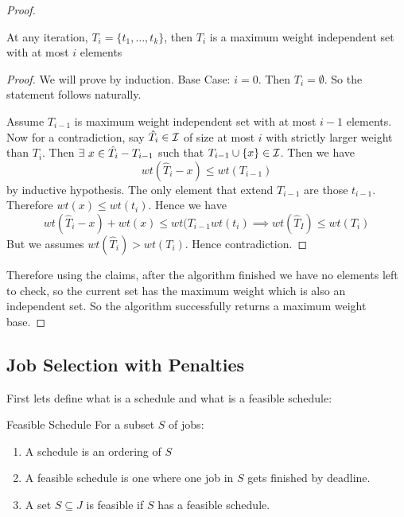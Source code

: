 \begin{proof}
\begin{claimwidth}
	\begin{claim}{}{}
	At any iteration, $T_i=\{t_1,\dots, t_k\}$, then $T_i$ is a maximum weight independent set with at most $i$ elements
\end{claim}
\begin{proof}
	We will prove by induction. Base Case: $i=0$. Then $T_i=\emptyset$. So the statement follows naturally.
	
	Assume $T_{i-1}$ is maximum weight independent set with at most $i-1$ elements. Now for a contradiction, say $\hat{T}_i\in\mathcal{I}$ of size at most $i$ with strictly larger weight than $T_i$. Then $\exists\ x\in \hat{T_i}-T_{i-1}$ such that $T_{i-1}\cup \{x\}\in \mathcal{I}$. Then we have $$wt(\hat{T}_i-x)\leq wt(T_{i-1})$$by inductive hypothesis. The only element that extend $T_{i-1}$ are those $t_{i-1}$. Therefore $wt(x)\leq wt(t_i)$. Hence we have $$wt(\hat{T}_i-x)+wt(x)\leq wt(T_{i-1}wt(t_i)\implies wt(\hat{T}_I)\leq wt(T_i)$$But we assumes $wt(\hat{T}_i)>wt(T_i)$. Hence contradiction. 
\end{proof}
\end{claimwidth}

	\parinn 
	
	Therefore using the claims, after the algorithm finished we have no elements left to check, so the current set has the maximum weight which is also an independent set. So the algorithm successfully returns a maximum weight base.
\end{proof}
\subsection{Job Selection with Penalties}

\begin{algoprob}
\end{algoprob}

First lets define what is a schedule and what is a feasible schedule:

\begin{Definition}{Feasible Schedule}{}
	For a subset $S$ of jobs:
	\begin{enumerate}[label=\bfseries\tiny\protect\circled{\small\arabic*}]
	\item A schedule is an ordering of $S$
	\item A feasible schedule is one where one job in $S$ gets finished by deadline.
	\item A set $S\subseteq J$ is feasible if $S$ has a feasible schedule.
	\end{enumerate}
\end{Definition}\parinn

